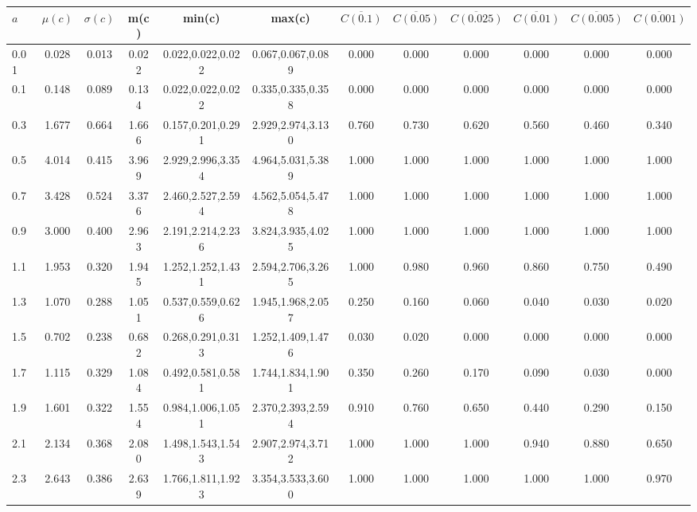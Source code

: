 \begin{table*}[h!]
\begin{center}
\begin{tabular}{| l | c | c | c | c | c | c | c | c | c | c | c |}\hline
$a$ & $\mu(c)$ & $\sigma(c)$ & m(c) & min(c) & max(c) & $\overline{C(0.1)}$ & $\overline{C(0.05)}$ & $\overline{C(0.025)}$ & $\overline{C(0.01)}$ & $\overline{C(0.005)}$ & $\overline{C(0.001)}$ \\\hline
0.01 & 0.028 & 0.013 & 0.022 & 0.022,0.022,0.022 & 0.067,0.067,0.089  & 0.000  & 0.000  & 0.000  & 0.000  & 0.000  & 0.000 \\\hline
0.1 & 0.148 & 0.089 & 0.134 & 0.022,0.022,0.022 & 0.335,0.335,0.358  & 0.000  & 0.000  & 0.000  & 0.000  & 0.000  & 0.000 \\\hline
0.3 & 1.677 & 0.664 & 1.666 & 0.157,0.201,0.291 & 2.929,2.974,3.130  & 0.760  & 0.730  & 0.620  & 0.560  & 0.460  & 0.340 \\\hline
0.5 & 4.014 & 0.415 & 3.969 & 2.929,2.996,3.354 & 4.964,5.031,5.389  & 1.000  & 1.000  & 1.000  & 1.000  & 1.000  & 1.000 \\\hline
0.7 & 3.428 & 0.524 & 3.376 & 2.460,2.527,2.594 & 4.562,5.054,5.478  & 1.000  & 1.000  & 1.000  & 1.000  & 1.000  & 1.000 \\\hline
0.9 & 3.000 & 0.400 & 2.963 & 2.191,2.214,2.236 & 3.824,3.935,4.025  & 1.000  & 1.000  & 1.000  & 1.000  & 1.000  & 1.000 \\\hline
1.1 & 1.953 & 0.320 & 1.945 & 1.252,1.252,1.431 & 2.594,2.706,3.265  & 1.000  & 0.980  & 0.960  & 0.860  & 0.750  & 0.490 \\\hline
1.3 & 1.070 & 0.288 & 1.051 & 0.537,0.559,0.626 & 1.945,1.968,2.057  & 0.250  & 0.160  & 0.060  & 0.040  & 0.030  & 0.020 \\\hline
1.5 & 0.702 & 0.238 & 0.682 & 0.268,0.291,0.313 & 1.252,1.409,1.476  & 0.030  & 0.020  & 0.000  & 0.000  & 0.000  & 0.000 \\\hline
1.7 & 1.115 & 0.329 & 1.084 & 0.492,0.581,0.581 & 1.744,1.834,1.901  & 0.350  & 0.260  & 0.170  & 0.090  & 0.030  & 0.000 \\\hline
1.9 & 1.601 & 0.322 & 1.554 & 0.984,1.006,1.051 & 2.370,2.393,2.594  & 0.910  & 0.760  & 0.650  & 0.440  & 0.290  & 0.150 \\\hline
2.1 & 2.134 & 0.368 & 2.080 & 1.498,1.543,1.543 & 2.907,2.974,3.712  & 1.000  & 1.000  & 1.000  & 0.940  & 0.880  & 0.650 \\\hline
2.3 & 2.643 & 0.386 & 2.639 & 1.766,1.811,1.923 & 3.354,3.533,3.600  & 1.000  & 1.000  & 1.000  & 1.000  & 1.000  & 0.970 \\\hline

\end{tabular}
\end{center}
\end{table*}
